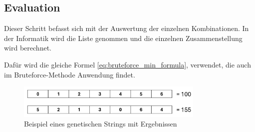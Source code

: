 %
%
%
%
\subsection{Evaluation
\label{buch:paper:varalg:subsection:evaluation}}
Dieser Schritt befasst sich mit der Auswertung der einzelnen 
Kombinationen. In der Informatik wird die Liste genommen und 
die einzelnen Zusammenstellung wird berechnet.

Dafür wird die gleiche Formel \ref{eq:bruteforce_min_formula}, 
verwendet, die auch im Bruteforce-Methode Anwendung findet.

\begin{figure}
	\centering
	\includegraphics[width=0.8\textwidth]{
        papers/varalg/images/teil3/03GeneticStringCitiesResults.png
        }
	\caption{Beispiel eines genetischen Strings mit Ergebnissen}
	\label{fig:cities_genetic_string_results}
\end{figure}

